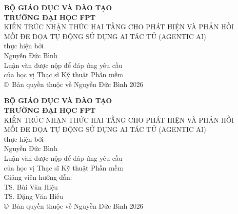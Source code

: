 \documentclass[12pt,a4paper]{report}
\begin{document}

\pagestyle{empty}

\begin{titlepage}
    \centering
    \vspace*{1cm}
    {\large\textbf{BỘ GIÁO DỤC VÀ ĐÀO TẠO}}\\[0.1cm]
    {\large\textbf{TRƯỜNG ĐẠI HỌC FPT}}\\[3cm]

    {\Large KIẾN TRÚC NHẬN THỨC HAI TẦNG CHO PHÁT HIỆN VÀ PHẢN HỒI MỐI ĐE DỌA TỰ ĐỘNG SỬ DỤNG AI TÁC TỬ (AGENTIC AI)}\\[3cm]

    thực hiện bởi\\[1cm]

    Nguyễn Đức Bình\\[3cm]

    Luận văn được nộp để đáp ứng yêu cầu\\
    của học vị Thạc sĩ Kỹ thuật Phần mềm\\[1cm]

    \vfill
    {\normalsize \copyright\ Bản quyền thuộc về Nguyễn Đức Bình 2026}
\end{titlepage}

\begin{titlepage}
    \centering
    \vspace*{1cm}
    {\large\textbf{BỘ GIÁO DỤC VÀ ĐÀO TẠO}}\\[0.1cm]
    {\large\textbf{TRƯỜNG ĐẠI HỌC FPT}}\\[3cm]

    {\Large KIẾN TRÚC NHẬN THỨC HAI TẦNG CHO PHÁT HIỆN VÀ PHẢN HỒI MỐI ĐE DỌA TỰ ĐỘNG SỬ DỤNG AI TÁC TỬ (AGENTIC AI)}\\[3cm]

    thực hiện bởi\\[1cm]

    Nguyễn Đức Bình\\[3cm]

    Luận văn được nộp để đáp ứng yêu cầu\\
    của học vị Thạc sĩ Kỹ thuật Phần mềm\\[2cm]

    Giảng viên hướng dẫn:\\
    TS. Bùi Văn Hiệu\\
    TS. Đặng Văn Hiếu\\[1cm]

    \vfill
    {\normalsize \copyright\ Bản quyền thuộc về Nguyễn Đức Bình 2026}
\end{titlepage}
\end{document}
